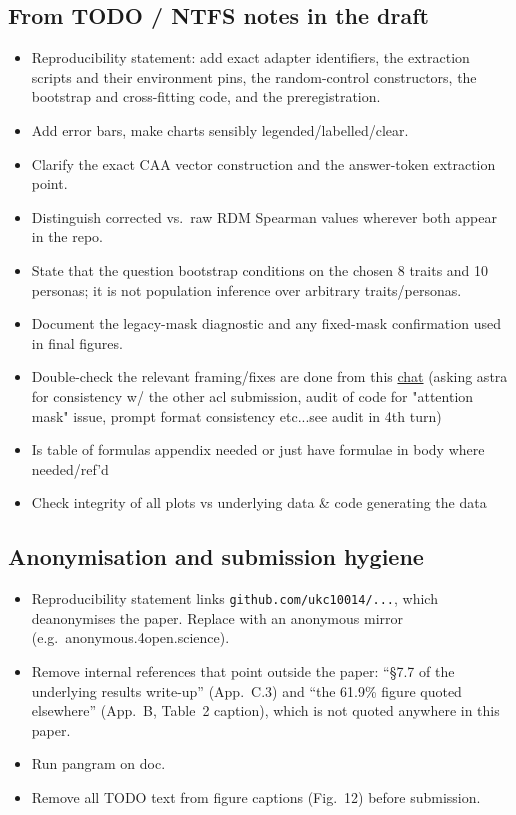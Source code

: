\documentclass{article}
\begin{document}
\subsection*{From TODO / NTFS notes in the draft}
\begin{itemize}
  \item Reproducibility statement: add exact adapter identifiers, the extraction scripts and their environment pins, the random-control constructors, the bootstrap and cross-fitting code, and the preregistration.
  \item Add error bars, make charts sensibly legended/labelled/clear.
  \item Clarify the exact CAA vector construction and the answer-token extraction point.
  \item Distinguish corrected vs.\ raw RDM Spearman values wherever both appear in the repo.
  \item State that the question bootstrap conditions on the chosen 8 traits and 10 personas; it is not population inference over arbitrary traits/personas.
  \item Document the legacy-mask diagnostic and any fixed-mask confirmation used in final figures.
  \item Double-check the relevant framing/fixes are done from this \href{https://chatgpt.com/share/6ab77f47-e7c4-83eb-87bf-bcd1eda57e7e}{chat} (asking astra for consistency w/ the other acl submission, audit of code for "attention mask" issue, prompt format consistency etc...see audit in 4th turn) 
  \item Is table of formulas appendix needed or just have formulae in body where needed/ref'd
  \item Check integrity of all plots vs underlying data \& code generating the data
\end{itemize}

\subsection*{Anonymisation and submission hygiene}
\begin{itemize}
  \item Reproducibility statement links \texttt{github.com/ukc10014/...}, which deanonymises the paper. Replace with an anonymous mirror (e.g.\ anonymous.4open.science).
  \item Remove internal references that point outside the paper: ``\S7.7 of the underlying results write-up'' (App.~C.3) and ``the 61.9\% figure quoted elsewhere'' (App.~B, Table~2 caption), which is not quoted anywhere in this paper.
  \item Run pangram on doc.
  \item Remove all TODO text from figure captions (Fig.~12) before submission.
\end{itemize}
\end{document}

